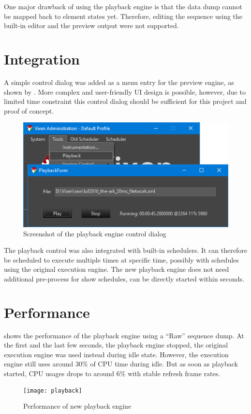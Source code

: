 One major drawback of using the playback engine is that the data dump cannot be mapped back to element states yet. Therefore, editing the sequence using the built-in editor and the preview output were not supported.

\section{Integration}

A simple control dialog was added as a menu entry for the preview engine, as shown by . More complex and user-friendly UI design is possible, however, due to limited time constraint this control dialog should be sufficient for this project and proof of concept.

\begin{figure}[t]
  \centering
  \includegraphics[width=0.8\columnwidth]{Figs/vixen_playback.png}
  \caption{\footnotesize Screenshot of the playback engine control dialog}
  \label{fig:vixen_playback}
\end{figure}

The playback control was also integrated with built-in schedulers. It can therefore be scheduled to execute multiple times at specific time, possibly with schedules using the original execution engine. The new playback engine does not need additional pre-process for show schedules, can be directly started within seconds.

\section{Performance}

 shows the performance of the playback engine using a ``Raw'' sequence dump. At the first and the last few seconds, the playback engine stopped, the original execution engine was used instead during idle state. However, the execution engine still uses around $30 \%$ of CPU time during idle. But as soon as playback started, CPU usages drops to around $6 \%$ with stable refresh frame rates.

\begin{figure}[t]
  \centering
  \texttt{[image: playback]}
  \caption{\footnotesize Performance of new playback engine}
  \label{fig:playback}
\end{figure}
